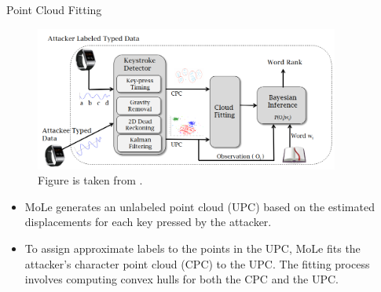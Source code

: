 \documentclass[ucs,9pt,usenames,dvipsnames]{beamer}
\begin{document}
\begin{frame}{Point Cloud Fitting}
	\begin{figure}
		\centering
		\includegraphics[width=10cm]{imgs/moleOverview}
		\caption{Figure is taken from \cite{b1}.}
	\end{figure}
	\begin{itemize}
		\item MoLe generates an unlabeled point cloud (UPC) based on the estimated displacements for each key pressed by the attacker.
		\item To assign approximate labels to the points in the UPC, MoLe fits the attacker's character point cloud (CPC) to the UPC. The fitting process involves computing convex hulls for both the CPC and the UPC.
	\end{itemize}
\end{frame}
\end{document}
